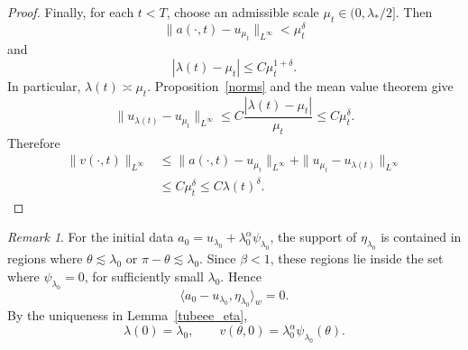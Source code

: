 \documentclass[11pt,a4paper]{article}
\numberwithin{equation}{section}
\theoremstyle{plain}
\theoremstyle{remark}
\newtheorem{remark}[theorem]{Remark}
\begin{document}
\begin{proof}
Finally, for each $t<T$, choose an admissible scale
$\mu_t\in(0,\lambda_*/2]$. Then
$$
\|a(\cdot,t)-u_{\mu_t}\|_{L^\infty}<\mu_t^\delta
$$
and
$$
|\lambda(t)-\mu_t|
\leq
C\mu_t^{1+\delta}.
$$
In particular, $\lambda(t)\asymp\mu_t$. Proposition~\ref{norms} and
the mean value theorem give
$$
\|u_{\lambda(t)}-u_{\mu_t}\|_{L^\infty}
\leq
C\frac{|\lambda(t)-\mu_t|}{\mu_t}
\leq
C\mu_t^\delta.
$$
Therefore
$$
\begin{aligned}
\|v(\cdot,t)\|_{L^\infty}
&\leq
\|a(\cdot,t)-u_{\mu_t}\|_{L^\infty}
+
\|u_{\mu_t}-u_{\lambda(t)}\|_{L^\infty}\\
&\leq
C\mu_t^\delta
\leq
C\lambda(t)^\delta.
\end{aligned}
$$
\end{proof}

\begin{remark}\label{initialscalerem}
For the initial data $a_0
=
u_{\lambda_0}
+
\lambda_0^\alpha\psi_{\lambda_0}$, the support of $\eta_{\lambda_0}$ is contained in regions where $\theta\lesssim\lambda_0$ or $\pi-\theta\lesssim\lambda_0$. Since $\beta<1$, these regions lie inside the set where
$\psi_{\lambda_0}=0$, for sufficiently small $\lambda_0$.
Hence
$$
\langle a_0-u_{\lambda_0},\eta_{\lambda_0}\rangle_w=0.
$$
By the uniqueness in Lemma~\ref{tubeee_eta},
$$
\lambda(0)=\lambda_0,
\qquad
v(\theta,0)=\lambda_0^\alpha\psi_{\lambda_0}(\theta).
$$
\end{remark}
\end{document}
